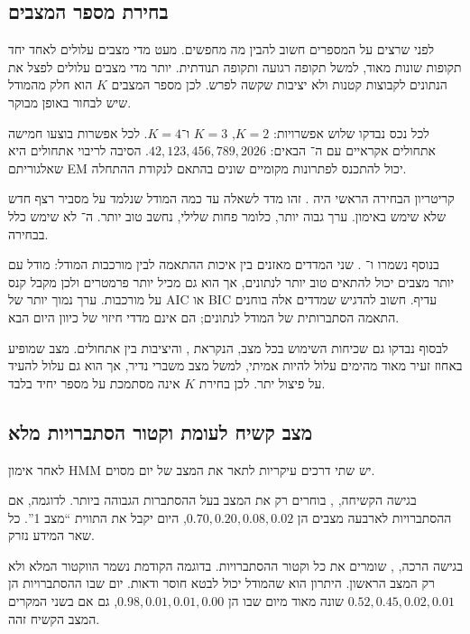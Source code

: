 \subsection{בחירת מספר המצבים}

לפני שרצים על המספרים חשוב להבין מה מחפשים. מעט מדי מצבים עלולים לאחד יחד תקופות שונות מאוד, למשל תקופה רגועה ותקופה תנודתית. יותר מדי מצבים עלולים לפצל את הנתונים לקבוצות קטנות ולא יציבות שקשה לפרש. לכן מספר המצבים \(K\) הוא חלק מהמודל שיש לבחור באופן מבוקר.

לכל נכס נבדקו שלוש אפשרויות: \(K=2\), \(K=3\) ו־\(K=4\). לכל אפשרות בוצעו חמישה אתחולים אקראיים עם ה־ הבאים: \(42,123,456,789,2026\). הסיבה לריבוי אתחולים היא שאלגוריתם EM יכול להתכנס לפתרונות מקומיים שונים בהתאם לנקודת ההתחלה.

קריטריון הבחירה הראשי היה . זהו מדד לשאלה עד כמה המודל שנלמד על  מסביר רצף חדש שלא שימש באימון. ערך גבוה יותר, כלומר פחות שלילי, נחשב טוב יותר. ה־ לא שימש כלל בבחירה.

בנוסף נשמרו  ו־ \cite{akaike1974new,schwarz1978estimating}. שני המדדים מאזנים בין איכות ההתאמה לבין מורכבות המודל: מודל עם יותר מצבים יכול להתאים טוב יותר לנתונים, אך הוא גם מכיל יותר פרמטרים ולכן מקבל קנס על מורכבות. ערך נמוך יותר של AIC או BIC עדיף. חשוב להדגיש שמדדים אלה בוחנים התאמה הסתברותית של המודל לנתונים; הם אינם מדדי חיזוי של כיוון היום הבא.

לבסוף נבדקו גם שכיחות השימוש בכל מצב, הנקראת , והיציבות בין אתחולים. מצב שמופיע באחוז זעיר מאוד מהימים עלול להיות אמיתי, למשל מצב משברי נדיר, אך הוא גם עלול להעיד על פיצול יתר. לכן בחירת \(K\) אינה מסתמכת על מספר יחיד בלבד.

\subsection{מצב קשיח לעומת וקטור הסתברויות מלא}

לאחר אימון HMM יש שתי דרכים עיקריות לתאר את המצב של יום מסוים.

בגישה הקשיחה, , בוחרים רק את המצב בעל ההסתברות הגבוהה ביותר. לדוגמה, אם ההסתברויות לארבעה מצבים הן \(0.70,0.20,0.08,0.02\), היום יקבל את התווית ``מצב 1''. כל שאר המידע נזרק.

בגישה הרכה, , שומרים את כל וקטור ההסתברויות. בדוגמה הקודמת נשמר הווקטור המלא ולא רק המצב הראשון. היתרון הוא שהמודל יכול לבטא חוסר ודאות. יום שבו ההסתברויות הן \(0.52,0.45,0.02,0.01\) שונה מאוד מיום שבו הן \(0.98,0.01,0.01,0.00\), גם אם בשני המקרים המצב הקשיח זהה.


